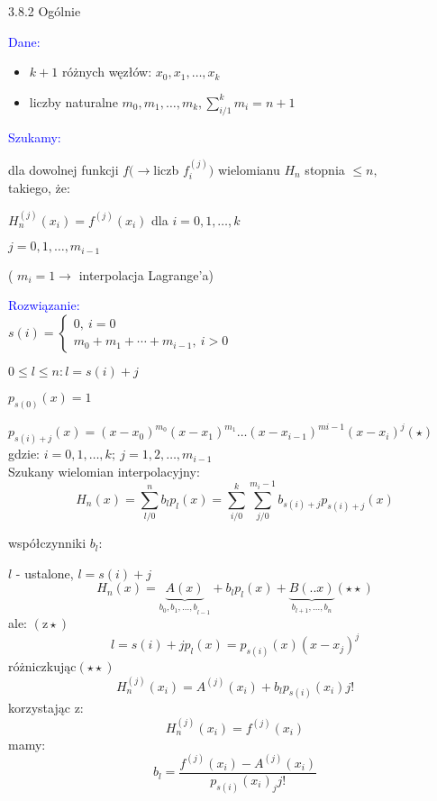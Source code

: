 \begin{frame}
{3.8.2 Ogólnie}

\textcolor{blue}{Dane:}
\begin{itemize}
\item $k+1$ różnych węzłów: $x_{0}, x_{1}, \dots, x_{k}$

\item liczby naturalne $m_{0}, m_{1},\dots , m_{k}, \displaystyle \sum_{i/1}^{k}m_{i}=n+1$
\end{itemize}
\textcolor{blue}{Szukamy:}

dla dowolnej funkcji $ f(\rightarrow$liczb {\it $f_{i}^{(j)}$}$)$ wielomianu $H_{n}$ stopnia $\leq n,$ \\
takiego, że:

$H_{n}^{(j)}(x_{i})=f^{(j)}(x_{i})$ \quad dla $i=0, 1, \dots , k$
\begin{center}
$j=0, 1, \dots, m_{i-1}$
\end{center}
( $m_{i}=1\rightarrow$ interpolacja Lagrange'a)
\end{frame}

\begin{frame}
\textcolor{blue}{Rozwiązanie:} \\
\vspace{2mm}
$s(i)=\left\{\begin{array}{l}
0,\ i=0\\
m_{0}+m_{1}+\cdots+m_{i-1},\ i>0
\end{array}\right.$
\vspace{2mm}

$0\leq l\leq n:l=s(i)+j$

$p_{s(0)}(x)=1$

$p_{s(i)+j}(x)=(x-x_{0})^{m_{0}}(x-x_{1})^{m_{1}}\ldots(x-x_{i-1})^{mi-1}(x-x_{i})^{j}(\star)$ \\
gdzie: $i=0, 1, \dots, k; \: j=1, 2, \dots , m_{i-1}$ \\
\vspace{3mm}
Szukany wielomian interpolacyjny:
$$
H_{n}(x)=\sum_{l/0}^{n}b_{l}p_{l}(x)=\sum_{i/0}^{k}\sum_{j/0}^{m_i-1}b_{s(i)+j}p_{s(i)+j}(x)
$$
\end{frame}

\begin{frame}
współczynniki $b_{l}$:


$l$ - ustalone, $l=s(i)+j$
$$
H_{n}(x)=\underbrace{A(x)}_{b_{0},{b_{1},\ldots,b}_{l-1}}+b_{l}p_{l}(x)+\underbrace{B(..x)}_{b_{l+1},\ldots,b_{n}}(\star\star)
$$
ale: $(\mathrm{z}\star)$
$$
l=s(i)+jp_{l}(x)=p_{s(i)}(x)(x-x_{j})^{j}
$$
$
$różniczkując$(\star\star)
$
$$
H_{n}^{(j)}(x_{i})=A^{(j)}(x_{i})+b_{l}p_{s(i)}(x_{i})j!
$$
korzystając $\mathrm{z}$:
$$
H_{n}^{(j)}(x_{i})=f^{(j)}(x_{i})
$$
mamy:
$$
b_{l}=\frac{f^{(j)}(x_{i})-A^{(j)}(x_{i})}{p_{s(i)}(x_{i})_{j}j!}
$$

\end{frame}